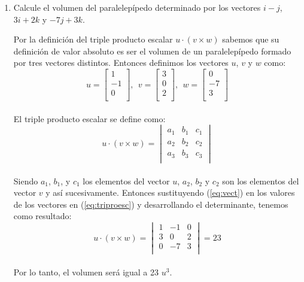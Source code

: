 \documentclass[12pt,titlepage]{article}
\begin{document}
\begin{enumerate}
\item Calcule el volumen del paralelepípedo determinado por los vectores $i-j$, $3i+2k$ y $-7j+3k$.
\par \parskip 8mm
Por la definición del triple producto escalar $u\cdot(v\times w)$ sabemos que su definición de valor absoluto es ser el volumen de un paralelepípedo formado por tres vectores distintos. Entonces definimos los vectores $u$, $v$ y $w$ como:
\begin{equation}
    u=\begin{bmatrix}1 \\ -1 \\ 0 \\\end{bmatrix},\ \ v=\begin{bmatrix}3\\0\\2\\\end{bmatrix},\ \ w=\begin{bmatrix}0\\-7\\3\\\end{bmatrix} \label{eq:vect}
\end{equation}\\
El triple producto escalar se define como:
\begin{equation}
    u\cdot(v\times w)=\begin{vmatrix}a_{1}&b_{1}&c_{1}\\a_{2}&b_{2}&c_{2}\\a_{3}&b_{3}&c_{3}\\\end{vmatrix} \label{eq:triproesc}
\end{equation}\\
Siendo $a_{1}$, $b_{1}$, y $c_{1}$ los elementos del vector $u$, $a_{2}$, $b_{2}$ y $c_{2}$ son los elementos del vector $v$ y así sucesivamente. Entonces sustituyendo (\ref{eq:vect}) en los valores de los vectores en (\ref{eq:triproesc}) y desarrollando el determinante, tenemos como resultado:
\begin{equation}
    u\cdot(v\times w)=\begin{vmatrix}1&-1&0\\3&0&2\\0&-7&3\\\end{vmatrix}=23 \label{eq:resultado}
\end{equation}\\
Por lo tanto, el volumen será igual a 23 $u^{3}$.



\end{enumerate}
\end{document}
